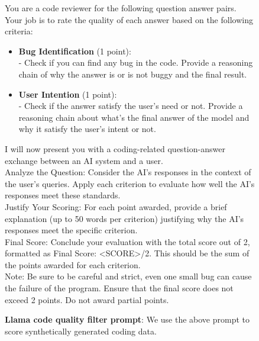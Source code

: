 \begin{figure}
  

\begin{framed}

You are a code reviewer for the following question answer pairs. Your job is to rate the quality of each answer based on the following criteria: \\

\begin{itemize}
\item \textbf{Bug Identification} (1 point): \\
    - Check if you can find any bug in the code. Provide a reasoning chain of why the answer is or is not buggy and the final result. \\

\item \textbf{User Intention} (1 point): \\
    - Check if the answer satisfy the user's need or not. Provide a reasoning chain about what's the final answer of the model and why it satisfy the user's intent or not. \\
    
\end{itemize} 

I will now present you with a coding-related question-answer exchange between an AI system and a user. \\

Analyze the Question: Consider the AI's responses in the context of the user's queries. Apply each criterion to evaluate how well the AI's responses meet these standards. \\

Justify Your Scoring: For each point awarded, provide a brief explanation (up to 50 words per criterion) justifying why the AI's responses meet the specific criterion. \\
        
Final Score: Conclude your evaluation with the total score out of 2, formatted as Final Score: <SCORE>/2. This should be the sum of the points awarded for each criterion. \\

Note: Be sure to be careful and strict, even one small bug can cause the failure of the program. Ensure that the final score does not exceed 2 points. Do not award partial points.

\end{framed}

  \caption{\textbf{Llama code quality filter prompt}: We use the above prompt to score synthetically generated coding data.}
  \label{fig:llama_quality_coding_prompt}
\end{figure}



